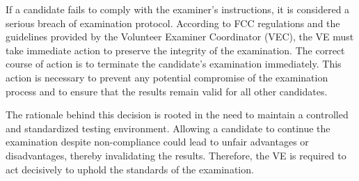If a candidate fails to comply with the examiner’s instructions, it is considered a serious breach of examination protocol. According to FCC regulations and the guidelines provided by the Volunteer Examiner Coordinator (VEC), the VE must take immediate action to preserve the integrity of the examination. The correct course of action is to terminate the candidate’s examination immediately. This action is necessary to prevent any potential compromise of the examination process and to ensure that the results remain valid for all other candidates.

The rationale behind this decision is rooted in the need to maintain a controlled and standardized testing environment. Allowing a candidate to continue the examination despite non-compliance could lead to unfair advantages or disadvantages, thereby invalidating the results. Therefore, the VE is required to act decisively to uphold the standards of the examination.

